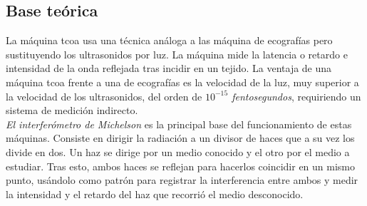 \subsection{Base teórica}
La máquina \gls{tcoa} usa una técnica análoga a las máquina de
ecografías pero sustituyendo los ultrasonidos por luz. La máquina mide
la latencia o retardo e intensidad de la onda reflejada tras incidir
en un tejido. La ventaja de una máquina \gls{tcoa} frente a una de
ecografías es la velocidad de la luz, muy superior a la velocidad de
los ultrasonidos, del orden de \emph{$10^{-15}$ fentosegundos}, requiriendo un sistema de medición indirecto.\\
\emph{El interferómetro de Michelson} es la principal base del
funcionamiento de estas máquinas. Consiste en dirigir la radiación a
un divisor de haces que a su vez los divide en dos. Un haz se dirige
por un medio conocido y el otro por el medio a
estudiar. Tras esto, ambos haces se reflejan para hacerlos coincidir
en un mismo punto, usándolo como patrón para registrar la interferencia entre
ambos y medir la intensidad y el retardo del haz que recorrió el medio
desconocido.

